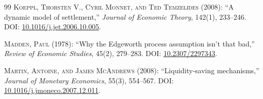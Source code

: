 \documentclass[ecta,draft]{econsocart}
\theoremstyle{definition}
\theoremstyle{definition}
\begin{document}
\begin{thebibliography}{99}
\textsc{Koeppl, Thorsten V., Cyril Monnet, and Ted Temzelides} (2008): ``A dynamic model of settlement,'' \emph{Journal of Economic Theory}, 142(1), 233--246. DOI: \url{10.1016/j.jet.2006.10.005}.

\textsc{Madden, Paul} (1978): ``Why the Edgeworth process assumption isn’t that bad,'' \emph{Review of Economic Studies}, 45(2), 279--283. DOI: \url{10.2307/2297343}.

\textsc{Martin, Antoine, and James McAndrews} (2008): ``Liquidity-saving mechanisms,'' \emph{Journal of Monetary Economics}, 55(3), 554--567. DOI: \url{10.1016/j.jmoneco.2007.12.011}.

\end{thebibliography}
\end{document}
